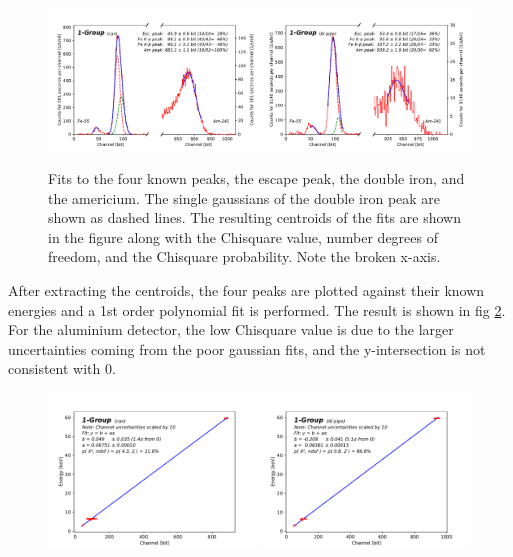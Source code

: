 \begin{figure}[htb]
  \includegraphics[width=0.49\textwidth]{graphics/channelfits.pdf}
  \includegraphics[width=0.49\textwidth]{graphics/aluchannelfits.pdf}
  \caption{Fits to the four known peaks, the escape peak, the double iron, and the americium. The single gaussians of the double iron peak are shown as dashed lines. The resulting centroids of the fits are shown in the figure along with the Chisquare value, number degrees of freedom, and the Chisquare probability. Note the broken x-axis.}
  \label{fig:channelfits}
\end{figure}

After extracting the centroids, the four peaks are plotted against their known energies and a 1st order polynomial fit is performed. The result is shown in fig \ref{fig:energychannelcalib}. For the aluminium detector, the low Chisquare value is due to the larger uncertainties coming from the poor gaussian fits, and the y-intersection is not consistent with 0.

\begin{figure}[htb]
  \includegraphics[width=0.49\textwidth]{graphics/energychannelcalib.pdf}
  \includegraphics[width=0.49\textwidth]{graphics/aluenergychannelcalib.pdf}
  \caption{}
  \label{fig:energychannelcalib}
\end{figure}

